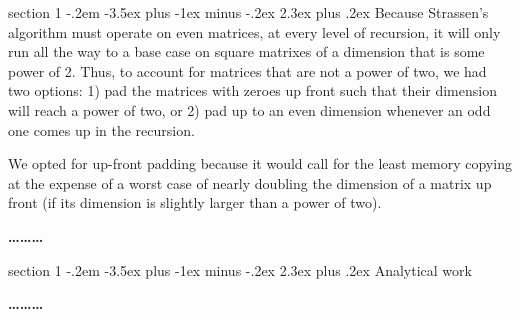 \documentclass[12pt]{article}
\makeatletter
\newenvironment{problem}{\@startsection
       {section}
       {1}
       {-.2em}
       {-3.5ex plus -1ex minus -.2ex}
       {2.3ex plus .2ex}
       {\pagebreak[3]%
       \large\bf\noindent{Problem }
       }
       }
       {%
       \begin{center}\large\bf \ldots\ldots\ldots\end{center}}
\makeatother
\begin{document}
\begin{problem}{}
Because Strassen's algorithm must operate on even matrices, at every level of recursion, it will only run all the way to a base case on square matrixes of a dimension that is some power of 2.  Thus, to account for matrices that are not a power of two, we had two options: 1) pad the matrices with zeroes up front such that their dimension will reach a power of two, or 2) pad up to an even dimension whenever an odd one comes up in the recursion.  

We opted for up-front padding because it would call for the least memory copying at the expense of a worst case of nearly doubling the dimension of a matrix up front (if its dimension is slightly larger than a power of two).

\end{problem}{}

\begin{problem}{}
Analytical work\\

\end{problem}{}
\end{document}
